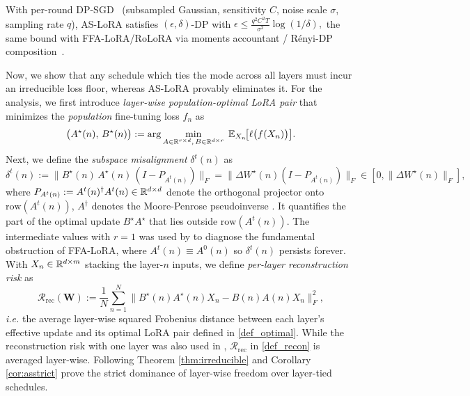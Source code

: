 \begin{theorem}\label{thm:privacy}
With per-round DP-SGD~\cite{abadi2016deep} (subsampled Gaussian, sensitivity $C$, noise scale $\sigma$, sampling rate $q$), AS-LoRA satisfies $(\epsilon,\delta)$-DP with
\(
\epsilon \le \tfrac{q^2 C^2 T}{\sigma^2}\log(1/\delta),
\)
the same bound with FFA-LoRA/RoLoRA via moments accountant / R\'enyi-DP composition~\citep{mironov2017renyi,wang2019sgm}.
\end{theorem}
Now, we show that any schedule which ties the mode across all layers must incur an irreducible loss floor, whereas AS-LoRA provably eliminates it. For the analysis, we first introduce \emph{layer-wise population-optimal LoRA pair} that minimizes the \emph{population} fine-tuning loss $f_n$ as
\begin{equation}\label{def_optimal}
\bigl(A^\star(n),\,B^\star(n)\bigr) :=\arg\min_{A\in\mathbb{R}^{r\times d},\,B\in\mathbb{R}^{d\times r}}\; \mathbb{E}_{X_{n}}\!\bigl[\ell\bigl(f(X_{n})\bigr)\bigr].
\end{equation}
Next, we define the \emph{subspace misalignment} $\delta^t(n)$ as
\begin{equation}\label{def_misalign}
    \delta^t(n) :=\bigl\|B^\star(n)\,A^\star(n)\,(I - P_{A^t(n)})\bigr\|_F  = \bigl\|\Delta W^\star(n)(I - P_{A^t(n)})\bigr\|_F
\in[0,\|\Delta W^\star(n)\|_F],
\end{equation}
where $P_{A^t(n)}:=A^t(n)^\dagger A^t(n)\in\mathbb{R}^{d\times d}$ denote the orthogonal projector onto $\mathrm{row}(A^t(n))$, $A^\dagger$ denotes the Moore-Penrose pseudoinverse \cite{barata2012moore}. It quantifies the part of the optimal update $B^\star A^\star$ that lies outside $\mathrm{row}(A^t(n))$. The intermediate values with $r=1$ was used by \cite{chen2025robust} to diagnose the fundamental obstruction of FFA-LoRA, where $A^t(n)\!\equiv\!A^0(n)$ so $\delta^t(n)$ persists forever. With $X_n\in\mathbb{R}^{d\times m}$ stacking the layer-$n$ inputs, we define \emph{per-layer reconstruction risk} as
\begin{equation} \label{def_recon}
    \mathcal R_\text{rec}(\mathbf W) :=\frac{1}{N}\sum_{n=1}^{N}\bigl\|B^\star(n)A^\star(n)X_n - B(n)A(n)X_n\bigr\|_F^2,
\end{equation}
\emph{i.e.} the average layer-wise squared Frobenius distance between each layer's effective update and its optimal LoRA pair defined in \eqref{def_optimal}. While the reconstruction risk with one layer was also used in \cite{chen2025robust}, $\mathcal R_\text{rec}$ in \eqref{def_recon} is averaged layer-wise. Following Theorem \ref{thm:irreducible} and Corollary \ref{cor:asstrict} prove the strict dominance of layer-wise freedom over layer-tied schedules.

